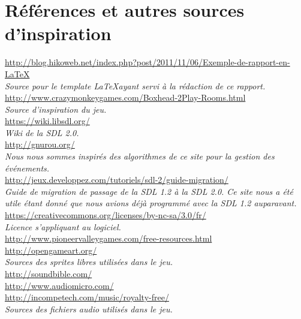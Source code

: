 \section*{Références et autres sources d'inspiration}

\url{http://blog.hikoweb.net/index.php?post/2011/11/06/Exemple-de-rapport-en-LaTeX} \\
\emph{Source pour le template \LaTeX ayant servi à la rédaction de ce rapport.} \\

\url{http://www.crazymonkeygames.com/Boxhead-2Play-Rooms.html} \\
\emph{Source d'inspiration du jeu.} \\

\url{https://wiki.libsdl.org/} \\
\emph{Wiki de la SDL 2.0.} \\

\url{http://gnurou.org/} \\
\emph{Nous nous sommes inspirés des algorithmes de ce site pour la gestion des événements.} \\

\url{http://jeux.developpez.com/tutoriels/sdl-2/guide-migration/} \\
\emph{Guide de migration de passage de la SDL 1.2 à la SDL 2.0. Ce site nous a été utile étant donné
que nous avions déjà programmé avec la SDL 1.2 auparavant.} \\

\url{https://creativecommons.org/licenses/by-nc-sa/3.0/fr/} \\
\emph{Licence s'appliquant au logiciel.} \\

\url{http://www.pioneervalleygames.com/free-resources.html} \\
\url{http://opengameart.org/} \\
\emph{Sources des sprites libres utilisées dans le jeu.} \\

\url{http://soundbible.com/} \\
\url{http://www.audiomicro.com/} \\
\url{http://incompetech.com/music/royalty-free/} \\
\emph{Sources des fichiers audio utilisés dans le jeu.} \\

